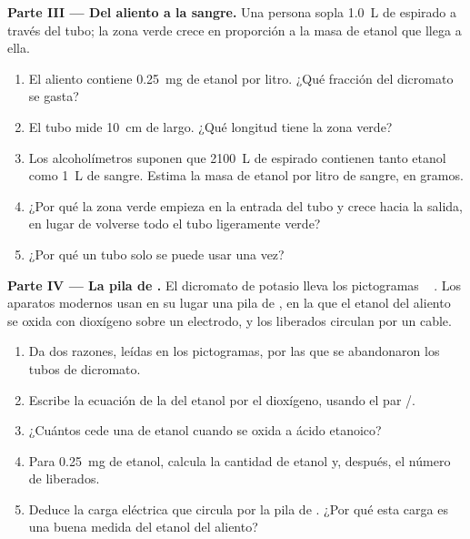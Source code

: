 \begin{problem}
\medskip
\noindent\textbf{Parte III --- Del aliento a la sangre.}
Una persona sopla \qty{1.0}{L} de  espirado a través del tubo; la
zona verde crece en proporción a la masa de etanol que llega a ella.
\begin{enumerate}[resume]
  \item El aliento contiene \qty{0.25}{mg} de etanol por litro. ¿Qué
        fracción del dicromato se gasta?
  \item El tubo mide \qty{10}{cm} de largo. ¿Qué longitud tiene la zona
        verde?
  \item Los alcoholímetros suponen que \qty{2100}{L} de  espirado
        contienen tanto etanol como \qty{1}{L} de sangre. Estima la masa
        de etanol por litro de sangre, en gramos.
  \item ¿Por qué la zona verde empieza en la entrada del tubo y crece
        hacia la salida, en lugar de volverse todo el tubo ligeramente
        verde?
  \item ¿Por qué un tubo solo se puede usar una vez?
\end{enumerate}

\medskip
\noindent\textbf{Parte IV --- La pila de .}
El dicromato de potasio lleva los pictogramas
\,\,\,\,\,.
Los aparatos modernos usan en su lugar una pila de , en la
que el etanol del aliento se oxida con dioxígeno sobre un electrodo, y
los  liberados circulan por un cable.
\begin{enumerate}[resume]
  \item Da dos razones, leídas en los pictogramas, por las que se
        abandonaron los tubos de dicromato.
  \item Escribe la ecuación de la  del etanol por el
        dioxígeno, usando el par /.
  \item ¿Cuántos  cede una  de etanol cuando se oxida
        a ácido etanoico?
  \item Para \qty{0.25}{mg} de etanol, calcula la cantidad de etanol y,
        después, el número de  liberados.
  \item Deduce la carga eléctrica que circula por la pila de
        . ¿Por qué esta carga es una buena medida del etanol
        del aliento?
\end{enumerate}
\end{problem}
